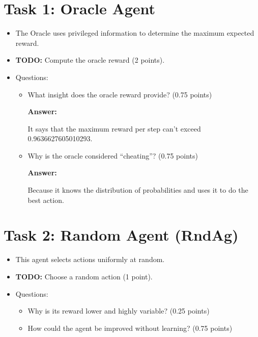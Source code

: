 \documentclass[12pt]{article}
\begin{document}
{{{\section{Task 1: Oracle Agent}
\begin{itemize}[noitemsep]
    \item The Oracle uses privileged information to determine the maximum expected reward.
    \item \textbf{TODO:} Compute the oracle reward (2 points).
    \item Questions:
    \begin{itemize}[noitemsep]
        \item What insight does the oracle reward provide? (0.75 points)

        \textbf{Answer:}

        It says that the maximum reward per step can't exceed 0.9636627605010293.
        
        \item Why is the oracle considered “cheating”? (0.75 points)

        \textbf{Answer:}

        Because it knows the distribution of probabilities and uses it to do the best action.
        
    \end{itemize}
\end{itemize}

\section{Task 2: Random Agent (RndAg)}
\begin{itemize}[noitemsep]
    \item This agent selects actions uniformly at random.
    \item \textbf{TODO:} Choose a random action (1 point).
    \item Questions:
    \begin{itemize}[noitemsep]
        \item Why is its reward lower and highly variable? (0.25 points)
        \item How could the agent be improved without learning? (0.75 points)
    \end{itemize}
\end{itemize}

}}}
\end{document}

